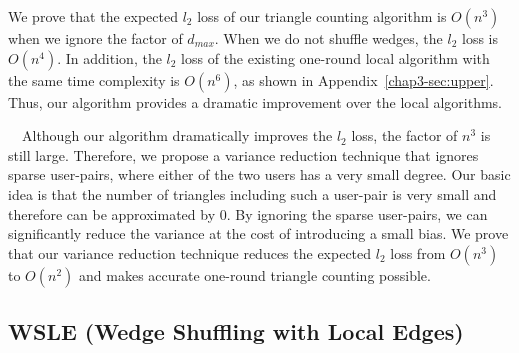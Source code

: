 We prove that the expected $l_2$ loss of our triangle counting algorithm is 
$O(n^3)$ when we ignore the factor of $d_{max}$. 
When we do not shuffle wedges, the 
$l_2$ loss is 
$O(n^4)$. 
In addition, the $l_2$ loss of the existing one-round local algorithm \cite{Imola_USENIX22} with the same time complexity is $O(n^6)$, as shown in 
Appendix~\ref{chap3-sec:upper}. 
Thus, our 
algorithm 
provides a dramatic improvement over the local algorithms. 

\smallskip
{}~~Although our 
algorithm 
dramatically 
improves 
the $l_2$ loss, the factor of $n^3$ is still large. 
Therefore, we propose a variance reduction technique that ignores sparse user-pairs, where either of the two users has a very small degree. 
Our basic idea is that the number of triangles including such a user-pair is very small 
and therefore can be approximated by $0$. 
By ignoring the sparse user-pairs, we can significantly reduce the variance at the cost of introducing a small bias. 
We prove that our variance reduction technique reduces the expected $l_2$ loss from $O(n^3)$ to $O(n^2)$ and makes accurate one-round triangle counting possible. 

\subsection{WSLE (Wedge Shuffling with Local Edges)}
\label{chap3-sub:wedge}

